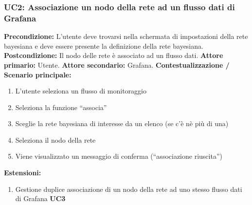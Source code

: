                \subsubsection{UC2: Associazione un nodo della rete ad un flusso dati di Grafana}
                    \textbf{Precondizione:}   L’utente deve trovarsi nella schermata di impostazioni della rete bayesiana e deve essere presente la definizione della rete bayesiana.
                    \newline
                    \textbf{Postcondizione:} Il nodo delle rete è associato ad un flusso dati.
                    \newline
                    \textbf{Attore primario:} Utente.
                    \newline
                    \textbf{Attore secondario:} Grafana.
                    \newline
                    \textbf{Contestualizzazione / Scenario principale:} \begin{enumerate}
                        \item L’utente seleziona un flusso di monitoraggio
                        \item Seleziona la funzione “associa”
                        \item Sceglie la rete bayesiana di interesse da un elenco (se c’è nè più di una)
                        \item Seleziona il nodo della rete
                        \item Viene visualizzato un messaggio di conferma (“associazione riuscita”)
                    \end{enumerate}
                    
                    \textbf{Estensioni:} \begin{enumerate}
                            \item Gestione duplice associazione di un nodo della rete ad uno stesso flusso dati di Grafana \textbf{UC3}
                        \end{enumerate}
                
